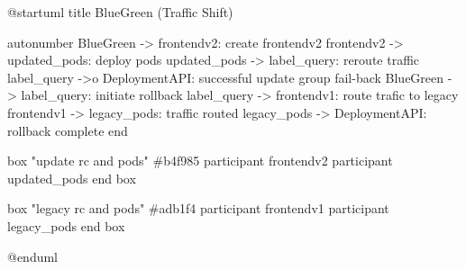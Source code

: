 @startuml
title BlueGreen (Traffic Shift)

autonumber
BlueGreen -> frontendv2: create frontendv2
frontendv2 -> updated_pods: deploy pods
updated_pods -> label_query: reroute traffic
label_query ->o DeploymentAPI: successful update
group fail-back
  BlueGreen -> label_query: initiate rollback
  label_query -> frontendv1: route trafic to legacy
  frontendv1 -> legacy_pods: traffic routed
  legacy_pods -> DeploymentAPI: rollback complete
end

box "update rc and pods" #b4f985
  participant frontendv2
  participant updated_pods
end box

box "legacy rc and pods" #adb1f4
  participant frontendv1
  participant legacy_pods
end box

@enduml
